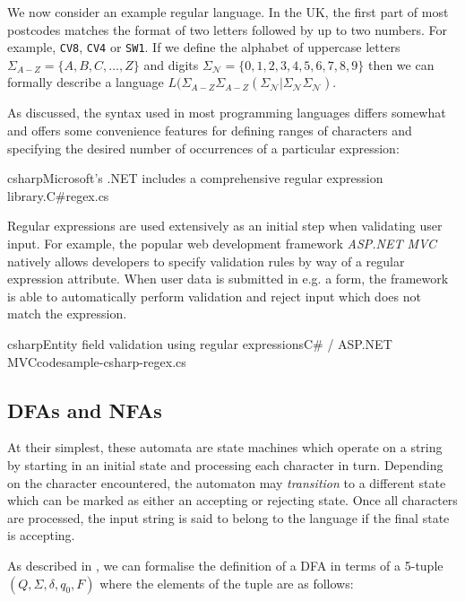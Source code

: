 \documentclass[a4paper,openany,12pt]{book}
\begin{document}
We now consider an example regular language. In the UK, the first part of most postcodes matches the format of two
letters followed by up to two numbers. For example, \texttt{CV8}, \texttt{CV4} or \texttt{SW1}.
If we define the alphabet of uppercase letters $\Sigma_{A-Z} = \{A, B, C, \ldots, Z\}$ and digits $\Sigma_\mathcal{N} =
\{0,1,2,3,4,5,6,7,8,9\}$ then we can formally describe a language $L(\Sigma_{A-Z} \Sigma_{A-Z}(\Sigma_\mathcal{N} |
\Sigma_\mathcal{N} \Sigma_\mathcal{N})$.

As discussed, the syntax used in most programming languages differs somewhat and offers some convenience features for
defining ranges of characters and specifying the desired number of occurrences of a particular expression:\\

\begin{mycodefile}{csharp}{Microsoft's .NET includes a comprehensive regular expression library.}{C\#}{regex.cs}
\end{mycodefile}

Regular expressions are used extensively as an initial step when validating user input.
For example, the popular web development framework \emph{ASP.NET MVC} natively allows developers to specify validation
rules by way of a regular expression attribute.
When user data is submitted in e.g. a form, the framework is able to automatically perform validation and reject input
which does not match the expression.

\begin{mycodefile}{csharp}{Entity field validation using regular expressions}{C\# / ASP.NET MVC}{codesample-csharp-regex.cs}
\end{mycodefile}

\subsection{DFAs and NFAs}
At their simplest, these automata are state machines which operate on a string by starting in an initial state and
processing each character in turn.
Depending on the character encountered, the automaton may \emph{transition} to a different state which can be marked as
either an accepting or rejecting state.
Once all characters are processed, the input string is said to belong to the language if the final state is accepting.

As described in \citet[p.~35]{sipser2012introduction}, we can formalise the definition of a DFA in terms of a 5-tuple
$(Q, \Sigma, \delta, q_0, F)$ where the elements of the tuple are as follows:
\end{document}
